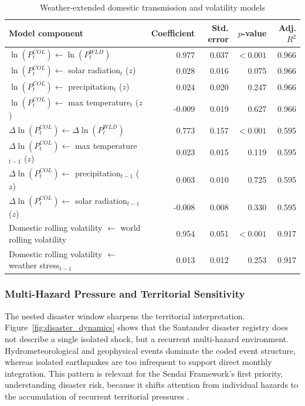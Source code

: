 \documentclass[11pt]{article}
\begin{document}
\begin{table}[H]
\centering
\caption{Weather-extended domestic transmission and volatility models}
\label{tab:weather_extended_models}
\small
\begin{tabular}{p{5.3cm}rrrr}
\toprule
Model component & Coefficient & Std. error & $p$-value & Adj. $R^2$ \\
\midrule
$\ln(P^{COL}_{t}) \leftarrow \ln(P^{WLD}_{t})$ & 0.977 & 0.037 & $<0.001$ & 0.966 \\
$\ln(P^{COL}_{t}) \leftarrow$ solar radiation$_t$ ($z$) & 0.028 & 0.016 & 0.075 & 0.966 \\
$\ln(P^{COL}_{t}) \leftarrow$ precipitation$_t$ ($z$) & 0.024 & 0.020 & 0.247 & 0.966 \\
$\ln(P^{COL}_{t}) \leftarrow$ max temperature$_t$ ($z$) & -0.009 & 0.019 & 0.627 & 0.966 \\
$\Delta \ln(P^{COL}_{t}) \leftarrow \Delta \ln(P^{WLD}_{t})$ & 0.773 & 0.157 & $<0.001$ & 0.595 \\
$\Delta \ln(P^{COL}_{t}) \leftarrow$ max temperature$_{t-1}$ ($z$) & 0.023 & 0.015 & 0.119 & 0.595 \\
$\Delta \ln(P^{COL}_{t}) \leftarrow$ precipitation$_{t-1}$ ($z$) & 0.003 & 0.010 & 0.725 & 0.595 \\
$\Delta \ln(P^{COL}_{t}) \leftarrow$ solar radiation$_{t-1}$ ($z$) & -0.008 & 0.008 & 0.330 & 0.595 \\
Domestic rolling volatility $\leftarrow$ world rolling volatility & 0.954 & 0.051 & $<0.001$ & 0.917 \\
Domestic rolling volatility $\leftarrow$ weather stress$_{t-1}$ & 0.013 & 0.012 & 0.253 & 0.917 \\
\bottomrule
\end{tabular}
\end{table}

\subsubsection{Multi-Hazard Pressure and Territorial Sensitivity}

The nested disaster window sharpens the territorial interpretation. Figure~\ref{fig:disaster_dynamics} shows that the Santander disaster registry does not describe a single isolated shock, but a recurrent multi-hazard environment. Hydrometeorological and geophysical events dominate the coded event structure, whereas isolated earthquakes are too infrequent to support direct monthly integration. This pattern is relevant for the Sendai Framework's first priority, understanding disaster risk, because it shifts attention from individual hazards to the accumulation of recurrent territorial pressures \citep{UNISDR2015}.
\end{document}
